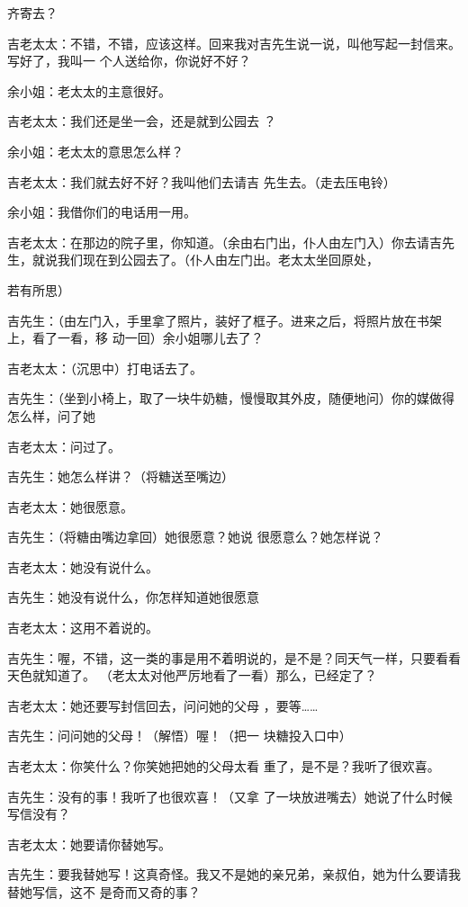 \documentclass{article}
\begin{document}
\newpage
齐寄去？ 

吉老太太：不错，不错，应该这样。回来我对吉先生说一说，叫他写起一封信来。写好了，我叫一
个人送给你，你说好不好？ 


余小姐：老太太的主意很好。 

吉老太太：我们还是坐一会，还是就到公园去
？ 


余小姐：老太太的意思怎么样？ 

吉老太太：我们就去好不好？我叫他们去请吉
先生去。（走去压电铃） 


余小姐：我借你们的电话用一用。 

吉老太太：在那边的院子里，你知道。（余由右门出，仆人由左门入）你去请吉先生，就说我们现在到公园去了。（仆人由左门出。老太太坐回原处，

\newpage
若有所思） 

吉先生：（由左门入，手里拿了照片，装好了框子。进来之后，将照片放在书架上，看了一看，移
动一回）余小姐哪儿去了？ 


吉老太太：（沉思中）打电话去了。 

吉先生：（坐到小椅上，取了一块牛奶糖，慢慢取其外皮，随便地问）你的媒做得怎么样，问了她


吉老太太：问过了。 


吉先生：她怎么样讲？（将糖送至嘴边） 


吉老太太：她很愿意。 

吉先生：（将糖由嘴边拿回）她很愿意？她说
很愿意么？她怎样说？ 


吉老太太：她没有说什么。 

\newpage

吉先生：她没有说什么，你怎样知道她很愿意


吉老太太：这用不着说的。 

吉先生：喔，不错，这一类的事是用不着明说的，是不是？同天气一样，只要看看天色就知道了。
（老太太对他严厉地看了一看）那么，已经定了？ 

吉老太太：她还要写封信回去，问问她的父母
，要等…… 

吉先生：问问她的父母！（解悟）喔！（把一
块糖投入口中） 

吉老太太：你笑什么？你笑她把她的父母太看
重了，是不是？我听了很欢喜。 

吉先生：没有的事！我听了也很欢喜！（又拿
了一块放进嘴去）她说了什么时候写信没有？ 


\newpage

吉老太太：她要请你替她写。 

吉先生：要我替她写！这真奇怪。我又不是她的亲兄弟，亲叔伯，她为什么要请我替她写信，这不
是奇而又奇的事？ 
\end{document}

